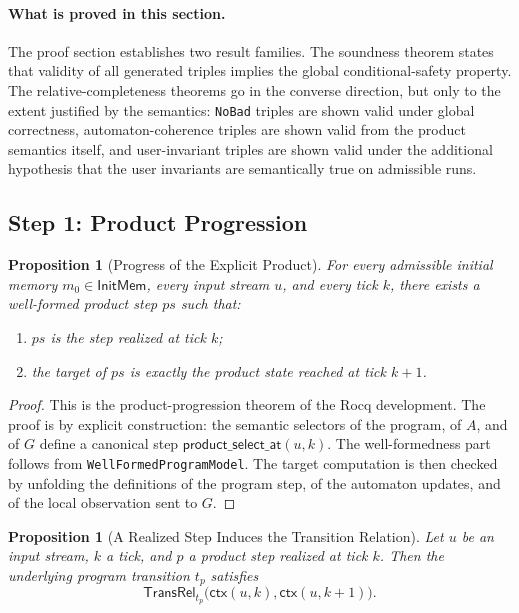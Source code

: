 \documentclass[11pt,a4paper]{article}
\newtheorem{proposition}[definition]{Proposition}
\newcommand{\ctx}{\mathsf{ctx}}
\begin{document}
\paragraph{What is proved in this section.}
The proof section establishes two result families. The soundness theorem states
that validity of all generated triples implies the global conditional-safety
property. The relative-completeness theorems go in the converse direction, but
only to the extent justified by the semantics: \texttt{NoBad} triples are shown
valid under global correctness, automaton-coherence triples are shown valid
from the product semantics itself, and user-invariant triples are shown valid
under the additional hypothesis that the user invariants are semantically true
on admissible runs.

\subsection{Step 1: Product Progression}

\begin{proposition}[Progress of the Explicit Product]
For every admissible initial memory \(m_0 \in \mathsf{InitMem}\), every input stream
\(u\), and every tick \(k\), there exists a well-formed product step \(ps\)
such that:
\begin{enumerate}[leftmargin=1.4em]
\item \(ps\) is the step realized at tick \(k\);
\item the target of \(ps\) is exactly the product state reached at tick \(k+1\).
\end{enumerate}
\end{proposition}

\begin{proof}
This is the product-progression theorem of the Rocq development. The proof is
by explicit construction: the semantic selectors of
the program, of \(A\), and of \(G\) define a canonical step
\(\mathsf{product\_select\_at}(u,k)\). The well-formedness part follows from
\texttt{WellFormedProgramModel}. The target computation is then checked by
unfolding the definitions of the program step, of the automaton updates, and of
the local observation sent to \(G\).
\end{proof}

\begin{proposition}[A Realized Step Induces the Transition Relation]
Let \(u\) be an input stream, \(k\) a tick, and \(p\) a product step realized
at tick \(k\). Then the underlying program transition \(t_p\) satisfies
\[
\mathsf{TransRel}_{t_p}\bigl(\ctx(u,k),\ctx(u,k+1)\bigr).
\]
\end{proposition}
\end{document}
